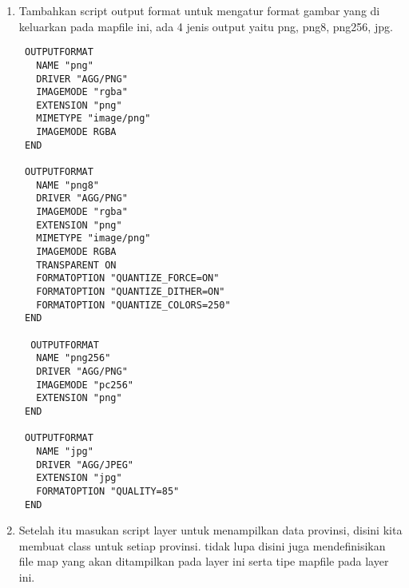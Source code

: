 \begin{enumerate}
\item Tambahkan script output format untuk mengatur format gambar yang di keluarkan pada mapfile ini, ada 4 jenis output yaitu png, png8, png256, jpg.
\begin{lstlisting}
 OUTPUTFORMAT
   NAME "png"
   DRIVER "AGG/PNG"
   IMAGEMODE "rgba"
   EXTENSION "png"
   MIMETYPE "image/png"
   IMAGEMODE RGBA
 END

 OUTPUTFORMAT
   NAME "png8"
   DRIVER "AGG/PNG"
   IMAGEMODE "rgba"
   EXTENSION "png"
   MIMETYPE "image/png"
   IMAGEMODE RGBA
   TRANSPARENT ON
   FORMATOPTION "QUANTIZE_FORCE=ON"
   FORMATOPTION "QUANTIZE_DITHER=ON"
   FORMATOPTION "QUANTIZE_COLORS=250"
 END

  OUTPUTFORMAT
   NAME "png256"
   DRIVER "AGG/PNG"
   IMAGEMODE "pc256"
   EXTENSION "png"
 END

 OUTPUTFORMAT
   NAME "jpg"
   DRIVER "AGG/JPEG"
   EXTENSION "jpg"
   FORMATOPTION "QUALITY=85"
 END
\end{lstlisting}
\item Setelah itu masukan script layer untuk menampilkan data provinsi, disini kita membuat class untuk setiap provinsi. tidak lupa disini juga mendefinisikan file map yang akan ditampilkan pada layer ini serta tipe mapfile pada layer ini. 
\end{enumerate}